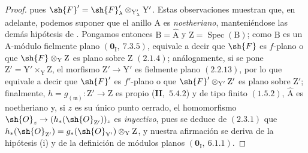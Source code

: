 \begin{proof}
pues $\sh{F}'=\sh{F}'_\lambda\otimes_{\mathrm{Y}'_\lambda}\mathrm{Y}'$. Estas observaciones muestran que, en adelante, podemos suponer que
el anillo $\mathrm{A}$ es \emph{noetheriano}, manteniéndose las demás hipótesis de . Pongamos entonces
$\mathrm{B}=\hat{\mathrm{A}}$ y $\mathrm{Z}=\operatorname{Spec}(\mathrm{B})$; como $\mathrm{B}$ es un $\mathrm{A}$-módulo fielmente plano $(\mathbf{0}_\mathrm{I},~7.3.5)$, equivale
a decir que $\sh{F}$ es $f$-plano o que $\sh{F}\otimes_\mathrm{Y}\mathrm{Z}$ es plano sobre $\mathrm{Z}$ $(2.1.4)$; análogamente, si se
pone $\mathrm{Z}'=\mathrm{Y}'\times_\mathrm{Y}\mathrm{Z}$, el morfismo $\mathrm{Z}'\to\mathrm{Y}'$ es fielmente plano $(2.2.13)$, por lo que
equivale a decir que $\sh{F}'$ es $f'$-plano o que $\sh{F}'\otimes_{\mathrm{Y}'}\mathrm{Z}'$ es plano sobre $\mathrm{Z}'$; finalmente, $h=g_{(\mathfrak{m})}:\mathrm{Z}'\to\mathrm{Z}$
es propio (\textbf{II},~$5.4.2$) y de tipo finito $(1.5.2)$, $\hat{\mathrm{A}}$ es noetheriano y, si $z$ es su
único punto cerrado, el homomorfismo $\sh{O}_z\to(h_*(\sh{O}_{\mathrm{Z}'}))_z$ es \emph{inyectivo}, pues se deduce de $(2.3.1)$ que
$h_*(\sh{O}_{\mathrm{Z}'})=g_*(\sh{O}_{\mathrm{Y}'})\otimes_\mathrm{Y}\mathrm{Z}$, y nuestra afirmación se deriva de la hipótesis (i) y de la definición de
módulos planos $(\mathbf{0}_\mathrm{I},~6.1.1)$.


\end{proof}
